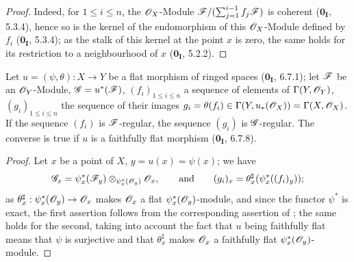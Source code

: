\begin{proof}
Indeed, for $1\leq i\leq n$, the $\mathscr{O}_X$-Module $\mathscr{F}/(\sum_{j=1}^{i-1}f_j\mathscr{F})$ is coherent ($\mathbf{0_I}$, 5.3.4), hence so is the kernel of the endomorphism of this $\mathscr{O}_X$-Module defined by $f_i$ ($\mathbf{0_I}$, 5.3.4);
as the stalk of this kernel at the point $x$ is zero, the same holds for its restriction to a neighbourhood of $x$ ($\mathbf{0_I}$, 5.2.2).
\end{proof}

\begin{proposition}[15.2.5]
\label{0.15.2.5}
Let $u=(\psi,\theta):X\to Y$ be a flat morphism of ringed spaces ($\mathbf{0_I}$, 6.7.1);
let $\mathscr{F}$ be an $\mathscr{O}_Y$-Module, $\mathscr{G}=u^*(\mathscr{F})$, $(f_i)_{1\leq i\leq n}$ a sequence of elements of $\Gamma(Y,\mathscr{O}_Y)$, $(g_i)_{1\leq i\leq n}$ the sequence of their images $g_i=\theta(f_i)\in\Gamma(Y,u_*(\mathscr{O}_X))=\Gamma(X,\mathscr{O}_X)$.
If the sequence $(f_i)$ is $\mathscr{F}$-regular, the sequence $(g_i)$ is $\mathscr{G}$-regular.
The converse is true if $u$ is a faithfully flat morphism ($\mathbf{0_I}$, 6.7.8).
\end{proposition}

\begin{proof}
Let $x$ be a point of $X$, $y=u(x)=\psi(x)$;
we have
\[
  \mathscr{G}_x=\psi_x^*(\mathscr{F}_y)\otimes_{\psi_x^*(\mathscr{O}_y)}\mathscr{O}_x,
  \qquad\text{and}\qquad
  (g_i)_x=\theta_x^\sharp(\psi_x^*((f_i)_y));
\]
as $\theta_x^\sharp:\psi_x^*(\mathscr{O}_y)\to\mathscr{O}_x$ makes $\mathscr{O}_x$ a flat $\psi_x^*(\mathscr{O}_y)$-module, and since the functor $\psi^*$ is exact, the first assertion follows from the corresponding assertion of ;
the same holds for the second, taking into account the fact that $u$ being faithfully flat means that $\psi$ is surjective and that $\theta_x^\sharp$ makes $\mathscr{O}_x$ a faithfully flat $\psi_x^*(\mathscr{O}_y)$-module.
\end{proof}
